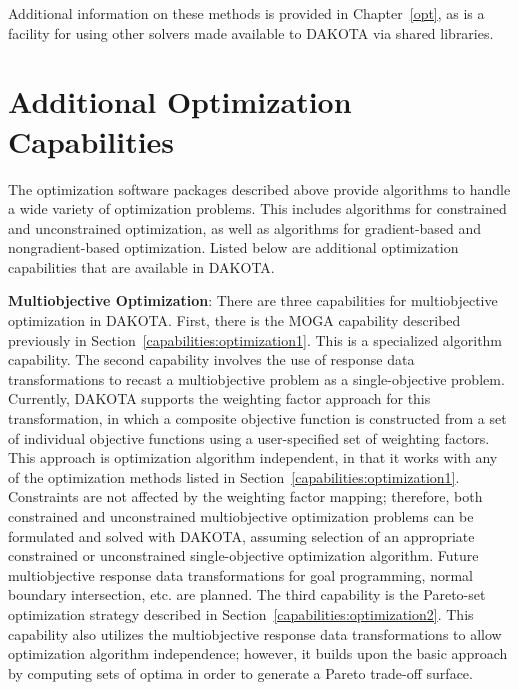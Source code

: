 Additional information on these methods is provided in Chapter~\ref{opt},
as is a facility for using other solvers made available to DAKOTA
via shared libraries.

\section{Additional Optimization Capabilities}\label{capabilities:additional}

The optimization software packages described above provide algorithms
to handle a wide variety of optimization problems. This includes
algorithms for constrained and unconstrained optimization, as well as
algorithms for gradient-based and nongradient-based
optimization. Listed below are additional optimization capabilities
that are available in DAKOTA.

\textbf{Multiobjective Optimization}:
There are three capabilities for multiobjective optimization in
DAKOTA.  First, there is the MOGA capability described previously in
Section~\ref{capabilities:optimization1}.  This is a specialized
algorithm capability.  The second capability involves the use of
response data transformations to recast a multiobjective problem as a
single-objective problem.  Currently, DAKOTA supports the weighting
factor approach for this transformation, in which a composite
objective function is constructed from a set of individual objective
functions using a user-specified set of weighting factors.  This
approach is optimization algorithm independent, in that it works with
any of the optimization methods listed in
Section~\ref{capabilities:optimization1}.  Constraints are not
affected by the weighting factor mapping; therefore, both constrained
and unconstrained multiobjective optimization problems can be
formulated and solved with DAKOTA, assuming selection of an
appropriate constrained or unconstrained single-objective optimization
algorithm.  Future multiobjective response data transformations for
goal programming, normal boundary intersection, etc. are planned.  The
third capability is the Pareto-set optimization strategy described in
Section~\ref{capabilities:optimization2}.  This capability also
utilizes the multiobjective response data transformations to allow
optimization algorithm independence; however, it builds upon the basic
approach by computing sets of optima in order to generate a Pareto
trade-off surface.

